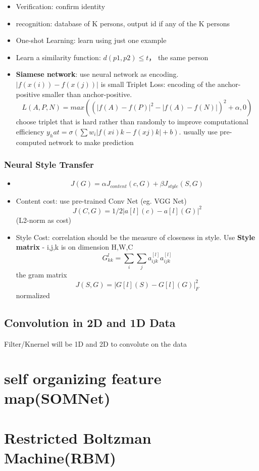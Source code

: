 \documentclass[11pt, openany]{book}              %
\begin{document}
\begin{itemize}
	\item Verification: confirm identity
	\item recognition: database of K persons, output id if any of the K persons
	\item One-shot Learning: learn using just one example
	\item Learn a similarity function: $d(p1,p2) \leq t$， the same person
	\item \textbf{Siamese network}: use neural network as encoding. $|f(x(i)) - f(x(j))|$ is small
	\subitem Triplet Loss: encoding of the anchor-positive smaller than anchor-positive.
	$$L(A,P,N) = max(( |f(A) - f(P)|^2 - |f(A) - f(N) |)^2 + \alpha, 0 )$$
	choose triplet that is hard rather than randomly to improve computational efficiency
	\subitem $y_hat = \sigma( \sum w_i|f(xi)k - f(xj)k| +b )$. usually use pre-computed network to make prediction
\end{itemize}

\subsubsection{Neural Style Transfer}

\begin{itemize}
	\item $$J(G) = \alpha J_{content}(c,G) + \beta J_{style}(S,G)$$
	\item Content cost: use pre-trained Conv Net (eg. VGG Net)
	 $$J(C,G) = 1/2|a[l](c) - a[l](G)|^2$$(L2-norm as cost)
	\item Style Cost: correlation should be the measure of closeness in style. Use \textbf{Style matrix} - i,j,k is on dimension H,W,C
	    $$G_{kk}^l = \sum_i\sum_j a_{ijk}^{[l]} a_{ijk}^{[l]}$$ the gram matrix
	    $$J(S,G) = |G[l](S) - G[l](G)|_F^2$$ normalized 
\end{itemize}
\subsection{Convolution in 2D and 1D Data}

Filter/Knernel will be 1D and 2D to convolute on the data

\section{self organizing feature map(SOMNet)}
\section{Restricted Boltzman Machine(RBM)}
\end{document}
